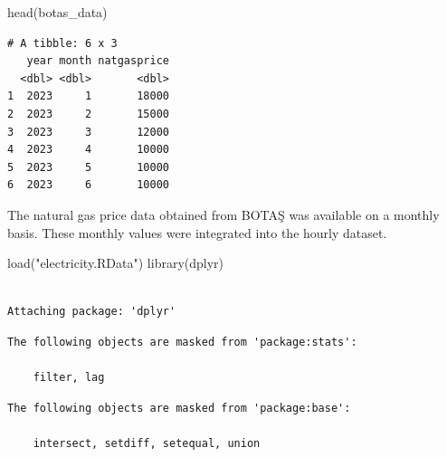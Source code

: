 \documentclass[
]{article}
\newenvironment{Shaded}{\begin{snugshade}}{\end{snugshade}}
\newcommand{\FunctionTok}[1]{\textcolor[rgb]{0.28,0.35,0.67}{#1}}
\newcommand{\NormalTok}[1]{\textcolor[rgb]{0.00,0.23,0.31}{#1}}
\newcommand{\StringTok}[1]{\textcolor[rgb]{0.13,0.47,0.30}{#1}}
\begin{document}
\begin{Shaded}
\begin{Highlighting}[]
\FunctionTok{head}\NormalTok{(botas\_data)}
\end{Highlighting}
\end{Shaded}

\begin{verbatim}
# A tibble: 6 x 3
   year month natgasprice
  <dbl> <dbl>       <dbl>
1  2023     1       18000
2  2023     2       15000
3  2023     3       12000
4  2023     4       10000
5  2023     5       10000
6  2023     6       10000
\end{verbatim}

The natural gas price data obtained from BOTAŞ was available on a
monthly basis. These monthly values were integrated into the hourly
dataset.

\begin{Shaded}
\begin{Highlighting}[]
\FunctionTok{load}\NormalTok{(}\StringTok{"electricity.RData"}\NormalTok{)}
\FunctionTok{library}\NormalTok{(dplyr)}
\end{Highlighting}
\end{Shaded}

\begin{verbatim}

Attaching package: 'dplyr'
\end{verbatim}

\begin{verbatim}
The following objects are masked from 'package:stats':

    filter, lag
\end{verbatim}

\begin{verbatim}
The following objects are masked from 'package:base':

    intersect, setdiff, setequal, union
\end{verbatim}
\end{document}
